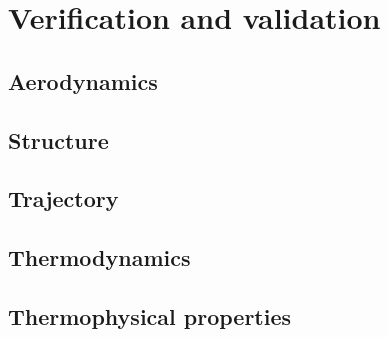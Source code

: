 \section{Verification and validation}

\subsection{Aerodynamics} \label{sec:VandVaero}


\subsection{Structure} \label{sec:VandVstruc}


\subsection{Trajectory} \label{sec:VandVtraj}


\subsection{Thermodynamics} \label{sec:VandVthermo}


\subsection{Thermophysical properties} \label{sec:VandVthermoprop}
